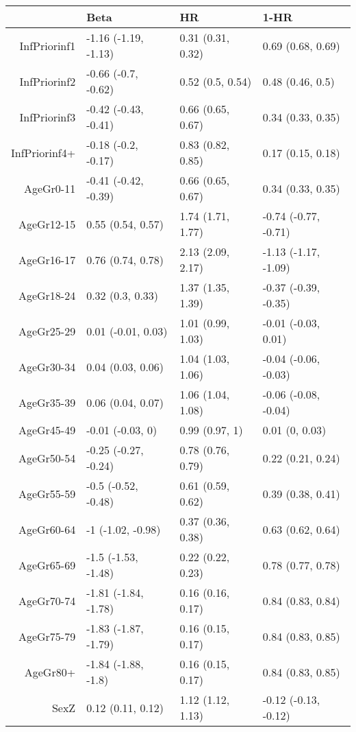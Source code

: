 \begin{table}[ht]
\centering
\begin{tabular}{rlll}
  \hline
 & Beta & HR & 1-HR \\ 
  \hline
InfPriorinf1 & -1.16 (-1.19, -1.13) & 0.31 (0.31, 0.32) & 0.69 (0.68, 0.69) \\ 
  InfPriorinf2 & -0.66 (-0.7, -0.62) & 0.52 (0.5, 0.54) & 0.48 (0.46, 0.5) \\ 
  InfPriorinf3 & -0.42 (-0.43, -0.41) & 0.66 (0.65, 0.67) & 0.34 (0.33, 0.35) \\ 
  InfPriorinf4+ & -0.18 (-0.2, -0.17) & 0.83 (0.82, 0.85) & 0.17 (0.15, 0.18) \\ 
  AgeGr0-11 & -0.41 (-0.42, -0.39) & 0.66 (0.65, 0.67) & 0.34 (0.33, 0.35) \\ 
  AgeGr12-15 & 0.55 (0.54, 0.57) & 1.74 (1.71, 1.77) & -0.74 (-0.77, -0.71) \\ 
  AgeGr16-17 & 0.76 (0.74, 0.78) & 2.13 (2.09, 2.17) & -1.13 (-1.17, -1.09) \\ 
  AgeGr18-24 & 0.32 (0.3, 0.33) & 1.37 (1.35, 1.39) & -0.37 (-0.39, -0.35) \\ 
  AgeGr25-29 & 0.01 (-0.01, 0.03) & 1.01 (0.99, 1.03) & -0.01 (-0.03, 0.01) \\ 
  AgeGr30-34 & 0.04 (0.03, 0.06) & 1.04 (1.03, 1.06) & -0.04 (-0.06, -0.03) \\ 
  AgeGr35-39 & 0.06 (0.04, 0.07) & 1.06 (1.04, 1.08) & -0.06 (-0.08, -0.04) \\ 
  AgeGr45-49 & -0.01 (-0.03, 0) & 0.99 (0.97, 1) & 0.01 (0, 0.03) \\ 
  AgeGr50-54 & -0.25 (-0.27, -0.24) & 0.78 (0.76, 0.79) & 0.22 (0.21, 0.24) \\ 
  AgeGr55-59 & -0.5 (-0.52, -0.48) & 0.61 (0.59, 0.62) & 0.39 (0.38, 0.41) \\ 
  AgeGr60-64 & -1 (-1.02, -0.98) & 0.37 (0.36, 0.38) & 0.63 (0.62, 0.64) \\ 
  AgeGr65-69 & -1.5 (-1.53, -1.48) & 0.22 (0.22, 0.23) & 0.78 (0.77, 0.78) \\ 
  AgeGr70-74 & -1.81 (-1.84, -1.78) & 0.16 (0.16, 0.17) & 0.84 (0.83, 0.84) \\ 
  AgeGr75-79 & -1.83 (-1.87, -1.79) & 0.16 (0.15, 0.17) & 0.84 (0.83, 0.85) \\ 
  AgeGr80+ & -1.84 (-1.88, -1.8) & 0.16 (0.15, 0.17) & 0.84 (0.83, 0.85) \\ 
  SexZ & 0.12 (0.11, 0.12) & 1.12 (1.12, 1.13) & -0.12 (-0.13, -0.12) \\ 
   \hline
\end{tabular}
\end{table}
